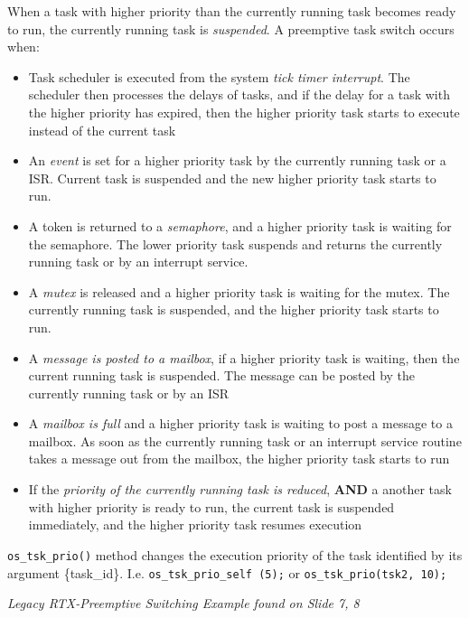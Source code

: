 \documentclass[a4paper,11pt]{article}
\newcommand{\code}[1]{\texttt{#1}}
\begin{document}
When a task with higher priority than the currently running task becomes ready to run, the currently running task is \emph{suspended}. A preemptive task switch occurs when:\par

\begin{itemize}
\item Task scheduler is executed from the system \emph{tick timer interrupt}. The scheduler then processes the delays of tasks, and if the delay for a task with the higher priority has expired, then the higher priority task starts to execute instead of the current task
\item An \emph{event} is set for a higher priority task by the currently running task or a ISR. Current task is suspended and the new higher priority task starts to run.
\item A token is returned to a \emph{semaphore}, and a higher priority task is waiting for the semaphore. The lower priority task suspends and returns the currently running task or by an interrupt service.
\item A \emph{mutex} is released and a higher priority task is waiting for the mutex. The currently running task is suspended, and the higher priority task starts to run. 
\item A \emph{message is posted to a mailbox}, if a higher priority task is waiting, then the current running task is suspended. The message can be posted by the currently running task or by an ISR
\item A \emph{mailbox is full} and a higher priority task is waiting to post a message to a mailbox. As soon as the currently running task or an interrupt service routine takes a message out from the mailbox, the higher priority task starts to run
\item If the \emph{priority of the currently running task is reduced}, \textbf{AND} a another task with higher priority is ready to run, the current task is suspended immediately, and the higher priority task resumes execution
\end{itemize}

\code{os\_tsk\_prio()} method changes the execution priority of the task identified by its argument \{task\_id\}.  I.e. \code{os\_tsk\_prio\_self (5);} or \code{os\_tsk\_prio(tsk2, 10);}\par

\emph{Legacy RTX-Preemptive Switching Example found on Slide 7, 8}\par
\end{document}

